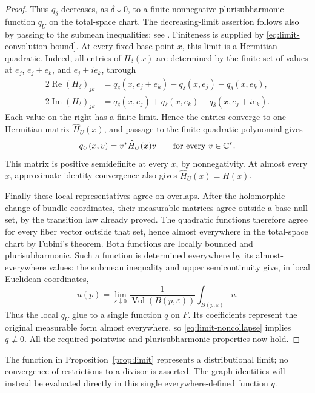 \begin{proof}
Thus $q_\delta$ decreases, as $\delta\downarrow0$, to a finite
nonnegative plurisubharmonic function $q_U$ on the total-space chart.
The decreasing-limit assertion follows also by passing to the
submean inequalities; see \cite[Chapter~I, Theorem~5.4]{DemaillyCADG}.
Finiteness is supplied by \eqref{eq:limit-convolution-bound}.
At every fixed base point $x$, this limit is a Hermitian quadratic.
Indeed, all entries of $H_\delta(x)$ are determined by the finite
set of values at $e_j$, $e_j+e_k$, and $e_j+i e_k$, through
\begin{align*}
2\operatorname{Re}(H_\delta)_{jk}
&=q_\delta(x,e_j+e_k)-q_\delta(x,e_j)-q_\delta(x,e_k),\\
2\operatorname{Im}(H_\delta)_{jk}
&=q_\delta(x,e_j)+q_\delta(x,e_k)-q_\delta(x,e_j+i e_k).
\end{align*}
Each value on the right has a finite limit.  Hence the entries
converge to one Hermitian matrix $\widehat H_U(x)$, and passage to the
finite quadratic polynomial gives
\[
q_U(x,v)=v^*\widehat H_U(x)v\qquad\text{for every }v\in\mathbb C^r.
\]
This matrix is positive semidefinite at every $x$, by nonnegativity.
At almost every $x$, approximate-identity convergence also gives
$\widehat H_U(x)=H(x)$.

Finally these local representatives agree on overlaps.  After the
holomorphic change of bundle coordinates, their measurable matrices
agree outside a base-null set, by the transition law already proved.
The quadratic functions therefore agree for every fiber vector
outside that set, hence almost everywhere in the total-space chart
by Fubini's theorem.  Both functions are locally bounded and
plurisubharmonic.  Such a function is determined everywhere by its
almost-everywhere values: the submean inequality and upper
semicontinuity give, in local Euclidean coordinates,
\[
u(p)=\lim_{\varepsilon\downarrow0}
\frac{1}{\operatorname{Vol}(B(p,\varepsilon))}
\int_{B(p,\varepsilon)}u.
\]
Thus the local $q_U$ glue to a single function $q$ on $F$.  Its
coefficients represent the original measurable form almost
everywhere, so \eqref{eq:limit-noncollapse} implies $q\not\equiv0$.
All the required pointwise and plurisubharmonic properties now hold.
\end{proof}

\begin{remark}\label{rmk:canonical-limit}
The function in Proposition~\ref{prop:limit} represents a
distributional limit; no convergence of restrictions to a divisor is
asserted. The graph identities will instead be evaluated directly in
this single everywhere-defined function $q$.
\end{remark}
